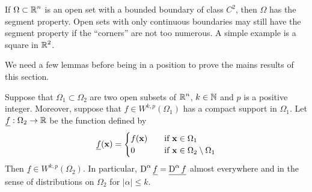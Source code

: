 
If $\displaystyle \Omega \subset \mathbb{R}^n$ is an open set with a bounded
boundary of class $\displaystyle C^2$, then $\Omega$ has the segment
property.  Open sets with only continuous boundaries may still have
the segment property if the ``corners'' are not too numerous.  A
simple example is a square in $\displaystyle \mathbb{R}^2$.

We need a few lemmas before being in a position to prove the mains
results of this section.

\begin{lemma} \label{sob_denselem1}
Suppose that $\Omega_1 \subset \Omega_2$ are two open subsets of
$\displaystyle \mathbb{R}^n$, $k\in \mathbb{N}$ and $p$ is a positive integer.
Moreover, suppose that $\displaystyle f \in W^{k,p}(\Omega_1)$ has a
compact support in $\Omega_1$.
Let $\underline{f}:\Omega_2 \to \mathbb{R}$ be the function defined by
\[
\underline{f}(\mathbf{x}) =
\begin{cases}
f(\mathbf{x}) & \quad \text{if} \ \mathbf{x} \in \Omega_1 \\
0 & \quad \text{if} \ \mathbf{x} \in \Omega_2 \setminus \Omega_1
\end{cases}
\]
Then $\displaystyle \underline{f} \in W^{k,p}(\Omega_2)$.  In particular,
$\displaystyle \operatorname{D}^\alpha \underline{f} = \underline{\operatorname{D}^\alpha f}$
almost everywhere and in the sense of distributions on $\Omega_2$
for $|\alpha|\leq k$.
\end{lemma}

